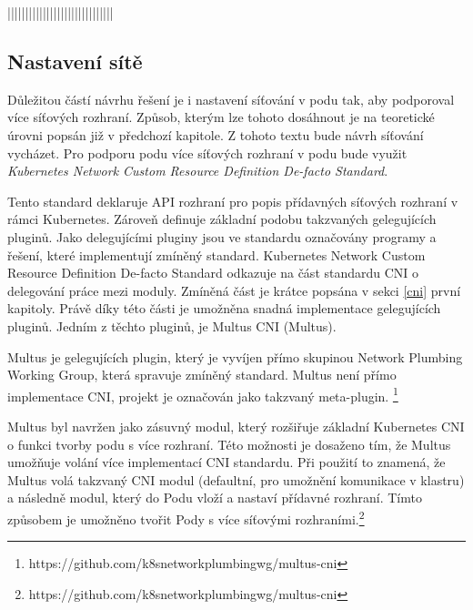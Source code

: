 ||||||||||||||||||||||||||||||
\subsection{Nastavení sítě}
Důležitou částí návrhu řešení je i nastavení síťování v podu tak, aby podporoval více síťových rozhraní. Způsob, kterým lze tohoto dosáhnout je na teoretické úrovni popsán již v předchozí kapitole. Z tohoto textu bude návrh síťování vycházet. Pro podporu podu více síťových rozhraní v podu bude využit \textit{Kubernetes Network Custom Resource Definition De-facto Standard}.   

Tento standard deklaruje API rozhraní pro popis přídavných síťových rozhraní v rámci Kubernetes. Zároveň definuje základní podobu takzvaných gelegujících pluginů. Jako delegujícími pluginy jsou ve standardu označovány programy a řešení, které implementují zmíněný standard. Kubernetes Network Custom Resource Definition De-facto Standard odkazuje na část standardu CNI o delegování práce mezi moduly. Zmíněná část je krátce popsána v sekci \ref{cni}  první kapitoly. Právě díky této části je umožněna snadná implementace gelegujících pluginů. Jedním z těchto pluginů, je Multus CNI (Multus). 



Multus je gelegujících plugin, který je vyvíjen přímo skupinou Network Plumbing Working Group, která spravuje zmíněný standard. Multus není přímo implementace CNI, projekt je označován jako takzvaný meta-plugin. \footnote{https://github.com/k8snetworkplumbingwg/multus-cni}

Multus byl navržen jako zásuvný modul, který rozšiřuje základní Kubernetes CNI o funkci tvorby podu s více rozhraní. Této možnosti je dosaženo tím, že Multus umožňuje volání více implementací CNI standardu. Při použití to znamená, že Multus volá takzvaný  CNI modul (defaultní, pro umožnění komunikace v klastru) a následně  modul, který do Podu vloží a nastaví přídavné rozhraní. Tímto způsobem je umožněno tvořit Pody s více síťovými rozhraními.\footnote{https://github.com/k8snetworkplumbingwg/multus-cni}

